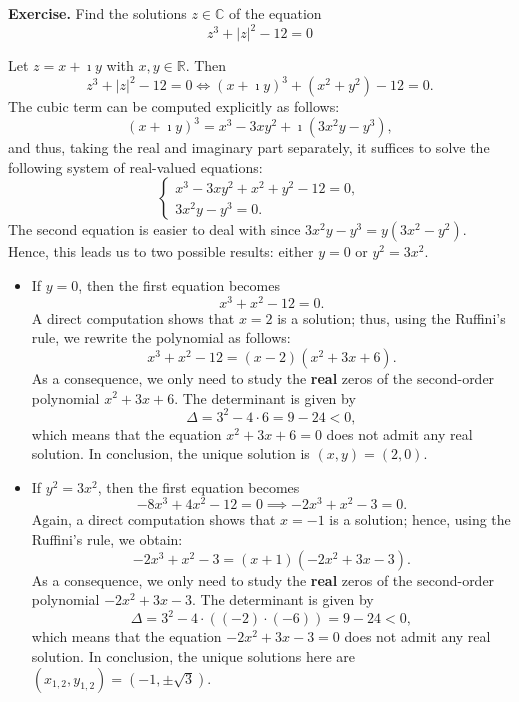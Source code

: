 \documentclass[a4paper,10 pt]{report}
\theoremstyle{definition}
\newcommand{\R}{\mathbb R}
\newcommand{\C}{\mathbb C}
\begin{document}
\begin{exerciseBox}
\textbf{Exercise.} Find the solutions $z \in \C$ of the equation
\[
z^3 + |z|^2 - 12 = 0
\]
\end{exerciseBox}


\begin{solutionBox} 
Let $z = x + \imath y$ with $x, y \in \R$. Then
\[
z^3 + |z|^2 - 12 = 0 \iff (x + \imath y)^3 + (x^2 + y^2) - 12 = 0.
\]
The cubic term can be computed explicitly as follows:
\[
(x + \imath y)^3 = x^3 - 3 x y^2 + \imath( 3x^2y - y^3 ),
\]
and thus, taking the real and imaginary part separately, it suffices to solve the following system of real-valued equations:
\begin{equation*} \begin{cases}x^3 - 3xy^2 + x^2 + y^2 - 12 = 0, \\ 3x^2 y - y^3 = 0. \end{cases}\end{equation*}
The second equation is easier to deal with since $3x^2 y - y^3 = y(3x^2 - y^2)$. Hence, this leads us to two possible results: either $y = 0$ or $y^2 = 3x^2$.
\begin{itemize}
	\item If $y=0$, then the first equation becomes
\[
x^3 + x^2 - 12 = 0.
\]
A direct computation shows that $x = 2$ is a solution; thus, using the Ruffini's rule, we rewrite the polynomial as follows:
\[
x^3 + x^2 - 12 = (x - 2)(x^2 + 3x + 6). 
\]
As a consequence, we only need to study the \textbf{real} zeros of the second-order polynomial $x^2 + 3x + 6$. The determinant is given by
\[
\Delta = 3^2 - 4 \cdot 6 = 9 - 24 < 0, 
\]
which means that the equation $x^2 + 3x + 6 = 0$ does not admit any real solution. In conclusion, the unique solution is $(x, y) = (2, 0)$.

\item If $y^2 = 3x^2$, then the first equation becomes
\[
- 8 x^3 + 4 x^2 - 12 = 0 \implies -2x^3 + x^2 - 3 = 0.
\]
Again, a direct computation shows that $x = -1$ is a solution; hence, using the Ruffini's rule, we obtain:
\[
-2x^3 + x^2 - 3 = (x + 1)(-2x^2 + 3x - 3).
\]
As a consequence, we only need to study the \textbf{real} zeros of the second-order polynomial $-2x^2 + 3x - 3$. The determinant is given by
\[
\Delta = 3^2 - 4 \cdot ((-2) \cdot (-6)) = 9 - 24 < 0,
\]
which means that the equation $-2x^2 + 3x - 3 = 0$ does not admit any real solution. In conclusion, the unique solutions here are $(x_{1,2}, y_{1,2}) = (-1, \pm \sqrt{3})$.
\end{itemize}


\end{solutionBox}
\end{document}
